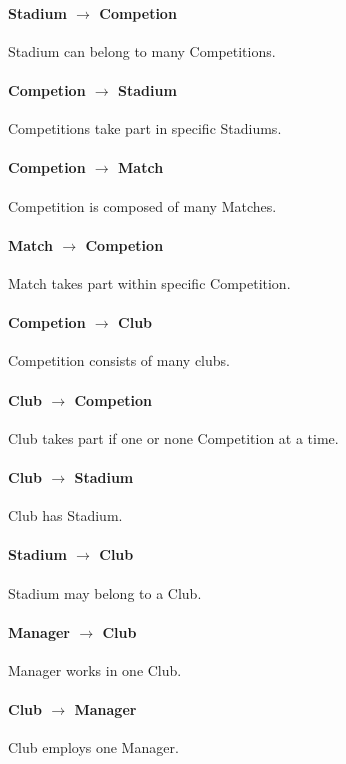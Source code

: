 \documentclass{report}
\begin{document}
\paragraph{Stadium      $\rightarrow$ Competion}
Stadium can belong to many Competitions.

\paragraph{Competion    $\rightarrow$ Stadium}
Competitions take part in specific Stadiums.

\paragraph{Competion    $\rightarrow$ Match}
Competition is composed of many Matches.

\paragraph{Match        $\rightarrow$ Competion}
Match takes part within specific Competition.

\paragraph{Competion $\rightarrow$ Club}
Competition consists of many clubs.

\paragraph{Club $\rightarrow$ Competion}
Club takes part if one or none Competition at a time.

\paragraph{Club $\rightarrow$ Stadium}
Club has Stadium.

\paragraph{Stadium $\rightarrow$ Club}
Stadium may belong to a Club.

\paragraph{Manager $\rightarrow$ Club}
Manager works in one Club.

\paragraph{Club $\rightarrow$ Manager}
Club employs one Manager.
\end{document}
